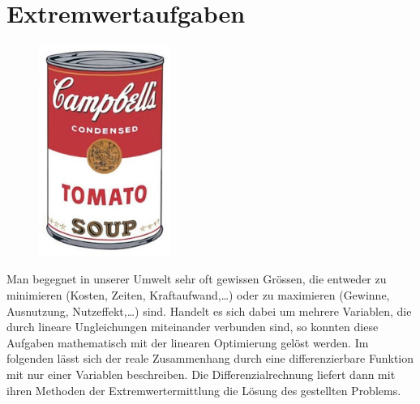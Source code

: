 \documentclass[%
<<<<<<< Updated upstream
11pt,%
twoside,%
titlepage,%
german,%
=======
11pt,%
twoside,%
titlepage,%
swissgerman,%
>>>>>>> Stashed changes
headsepline%
]{scrartcl}
\theoremstyle{definition}
\theoremstyle{plain}
\begin{document}
\clearpage

\section{Extremwertaufgaben}

\begin{figure}
\vspace{-22pt}
  \begin{center}
    \includegraphics[width=0.382\textwidth]{pictures/can}
  \end{center}
\vspace{-10pt}
\end{figure}
Man begegnet in unserer Umwelt sehr oft gewissen Grössen, die entweder zu minimieren (Kosten, Zeiten, Kraftaufwand,\dots) oder zu maximieren (Gewinne, Ausnutzung, Nutzeffekt,\dots) sind. Handelt es sich dabei um mehrere Variablen, die durch lineare Ungleichungen miteinander verbunden sind, so konnten diese Aufgaben mathematisch mit der linearen Optimierung gelöst werden. Im folgenden lässt sich der reale Zusammenhang durch eine differenzierbare Funktion mit nur einer Variablen beschreiben. Die Differenzialrechnung liefert dann mit ihren Methoden der Extremwertermittlung die Lösung des gestellten Problems.
\end{document}

